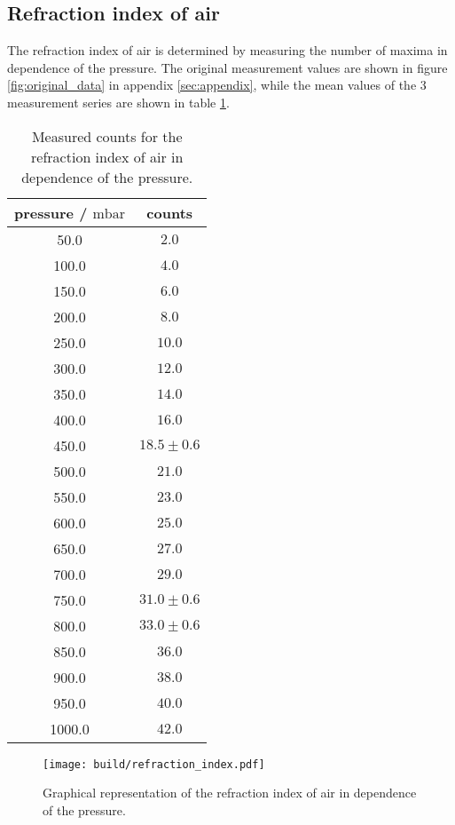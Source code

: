 \subsection{Refraction index of air}
\label{subsec:refraction_air}

The refraction index of air is determined by measuring the number of maxima in dependence of the pressure.
The original measurement values are shown in figure \ref{fig:original_data} in appendix \ref{sec:appendix}, while the mean values of the 3 measurement series are shown in table \ref{tab:refraction_air}.
\begin{table}[htbp]
    \centering
    \begin{tabular}{c c}
        \toprule
        pressure / $\si{\milli\bar}$  & counts \\    
        \midrule
        50.0 & $2.0$\\
        100.0 & $4.0$\\
        150.0 & $6.0$\\
        200.0 & $8.0$\\
        250.0 & $10.0$\\
        300.0 & $12.0$\\
        350.0 & $14.0$\\
        400.0 & $16.0$\\
        450.0 & $18.5\pm0.6$\\
        500.0 & $21.0$\\
        550.0 & $23.0$\\
        600.0 & $25.0$\\
        650.0 & $27.0$\\
        700.0 & $29.0$\\
        750.0 & $31.0\pm0.6$\\
        800.0 & $33.0\pm0.6$\\
        850.0 & $36.0$\\
        900.0 & $38.0$\\
        950.0 & $40.0$\\
        1000.0 & $42.0$\\
    \end{tabular}
    \caption{Measured counts for the refraction index of air in dependence of the pressure.}
    \label{tab:refraction_air}
\end{table}


\begin{figure}[H]
    \centering
    \texttt{[image: build/refraction\_index.pdf]}
    \caption{Graphical representation of the refraction index of air in dependence of the pressure.}
    \label{fig:refraction_index}
  \end{figure}
